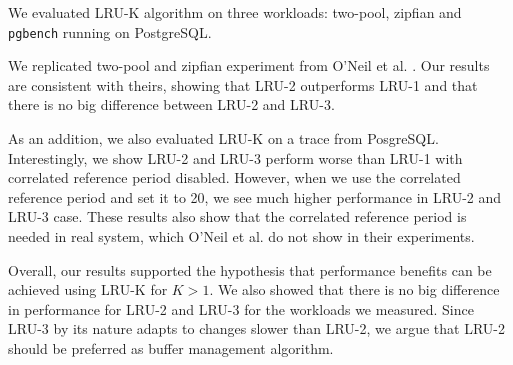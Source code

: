 We evaluated LRU-K algorithm on three workloads: two-pool, zipfian and \texttt{pgbench} running on PostgreSQL. 

We replicated two-pool and zipfian experiment from O'Neil et al. \cite{lruk}. Our results are consistent with theirs, showing that LRU-2 outperforms LRU-1 and that there is no big difference between LRU-2 and LRU-3.

As an addition, we also evaluated LRU-K on a trace from PosgreSQL. Interestingly, we show LRU-2 and LRU-3 perform worse than LRU-1 with correlated reference period disabled. However, when we use the correlated reference period and set it to 20, we see much higher performance in LRU-2 and LRU-3 case. These results also show that the correlated reference period is needed in real system, which O'Neil et al. \cite{lruk} do not show in their experiments.

Overall, our results supported the hypothesis that performance benefits can be achieved using LRU-K for $K > 1$. We also showed that there is no big difference in performance for LRU-2 and LRU-3 for the workloads we measured. Since LRU-3 by its nature adapts to changes slower than LRU-2, we argue that LRU-2 should be preferred as buffer management algorithm.